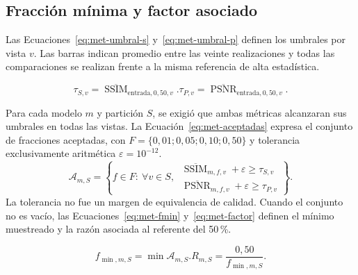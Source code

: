 \subsection{Fracción mínima y factor asociado}\label{subsec:met-minimo}
Las Ecuaciones~\eqref{eq:met-umbral-s} y~\eqref{eq:met-umbral-p} definen los umbrales por vista $v$. Las barras indican promedio entre las veinte realizaciones y todas las comparaciones se realizan frente a la misma referencia de alta estadística.
\begin{samepage}\begin{subequations}
\begin{equation}\tau_{S,v}=\overline{\operatorname{SSIM}}_{\mathrm{entrada},0{,}50,v}.\label{eq:met-umbral-s}\end{equation}
\begin{equation}\tau_{P,v}=\overline{\operatorname{PSNR}}_{\mathrm{entrada},0{,}50,v}.\label{eq:met-umbral-p}\end{equation}
\end{subequations}\end{samepage}
Para cada modelo $m$ y partición $S$, se exigió que ambas métricas alcanzaran sus umbrales en todas las vistas. La Ecuación~\eqref{eq:met-aceptadas} expresa el conjunto de fracciones aceptadas, con $F=\{0{,}01;0{,}05;0{,}10;0{,}50\}$ y tolerancia exclusivamente aritmética $\varepsilon=10^{-12}$.
\begin{equation}
\mathcal A_{m,S}=\left\{f\in F:\ \forall v\in S,\
\begin{array}{l}\overline{\operatorname{SSIM}}_{m,f,v}+\varepsilon\geq\tau_{S,v}\\
\overline{\operatorname{PSNR}}_{m,f,v}+\varepsilon\geq\tau_{P,v}\end{array}\right\}.
\label{eq:met-aceptadas}\end{equation}
La tolerancia no fue un margen de equivalencia de calidad. Cuando el conjunto no es vacío, las Ecuaciones~\eqref{eq:met-fmin} y~\eqref{eq:met-factor} definen el mínimo muestreado y la razón asociada al referente del 50\,\%.
\begin{samepage}\begin{subequations}
\begin{equation}f_{\min,m,S}=\min\mathcal A_{m,S}.\label{eq:met-fmin}\end{equation}
\begin{equation}R_{m,S}=\frac{0{,}50}{f_{\min,m,S}}.\label{eq:met-factor}\end{equation}
\end{subequations}\end{samepage}
